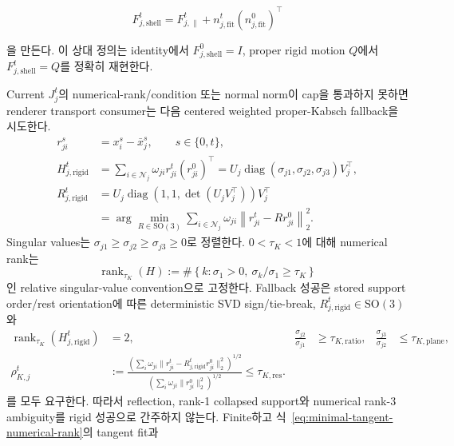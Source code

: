 \documentclass[11pt]{article}
\begin{document}
\begin{equation}
  F_{j,\mathrm{shell}}^t
  =
  F_{j,\parallel}^t
  +n_{j,\mathrm{fit}}^t(n_{j,\mathrm{fit}}^0)^\top
  \label{eq:minimal-shell-extension}
\end{equation}

을 만든다. 이 상대 정의는 identity에서 \(F_{j,\mathrm{shell}}^0=I\),
proper rigid motion \(Q\)에서 \(F_{j,\mathrm{shell}}^t=Q\)를 정확히 재현한다.

Current \(J_j^t\)의 numerical-rank/condition 또는 normal norm이 cap을 통과하지 못하면
renderer transport consumer는 다음 centered weighted proper-Kabsch fallback을 시도한다.
\begin{equation}
\begin{aligned}
  r_{ji}^s&=x_i^s-\bar x_j^s,\qquad s\in\{0,t\},\\
  H_{j,\mathrm{rigid}}^t
  &=\sum_{i\in\mathcal N_j}\omega_{ji}r_{ji}^t(r_{ji}^0)^\top
    =U_j\operatorname{diag}(\sigma_{j1},\sigma_{j2},\sigma_{j3})V_j^\top,\\
  R_{j,\mathrm{rigid}}^t
  &=U_j\operatorname{diag}
    \left(1,1,\det(U_jV_j^\top)\right)V_j^\top\\
  &=\arg\min_{R\in\mathrm{SO}(3)}
    \sum_{i\in\mathcal N_j}\omega_{ji}
    \left\|r_{ji}^t-Rr_{ji}^0\right\|_2^2 .
\end{aligned}
  \label{eq:minimal-renderer-rigid-fallback}
\end{equation}
Singular values는 \(\sigma_{j1}\geq\sigma_{j2}\geq\sigma_{j3}\geq0\)로 정렬한다.
\(0<\tau_K<1\)에 대해 numerical rank는
\[
  \operatorname{rank}_{\tau_K}(H)
  :=\#\left\{k:\sigma_1>0,\ \sigma_k/\sigma_1\geq\tau_K\right\}
\]
인 relative singular-value convention으로 고정한다.
Fallback 성공은 stored support order/rest orientation에 따른 deterministic SVD sign/tie-break,
\(R_{j,\mathrm{rigid}}^t\in\mathrm{SO}(3)\)와
\[
\begin{aligned}
  \operatorname{rank}_{\tau_K}(H_{j,\mathrm{rigid}}^t)&=2,
  &\frac{\sigma_{j2}}{\sigma_{j1}}&\geq\tau_{K,\mathrm{ratio}},
  &\frac{\sigma_{j3}}{\sigma_{j2}}&\leq\tau_{K,\mathrm{plane}},\\
  \rho_{K,j}^t
  &:=\frac{
    \left(\sum_i\omega_{ji}
    \|r_{ji}^t-R_{j,\mathrm{rigid}}^tr_{ji}^0\|_2^2\right)^{1/2}
  }{
    \left(\sum_i\omega_{ji}\|r_{ji}^0\|_2^2\right)^{1/2}}
  \leq\tau_{K,\mathrm{res}}.
\end{aligned}
\]
를 모두 요구한다. 따라서 reflection, rank-1 collapsed support와 numerical rank-3 ambiguity를
rigid 성공으로 간주하지 않는다. Finite하고 식~\eqref{eq:minimal-tangent-numerical-rank}의 tangent fit과
\end{document}
